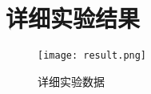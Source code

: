 
\chapter{详细实验结果}



\begin{figure}[htb]
  \centering
  \texttt{[image: result.png]}
  \caption{详细实验数据}
  \label{fig:results}
\end{figure}


